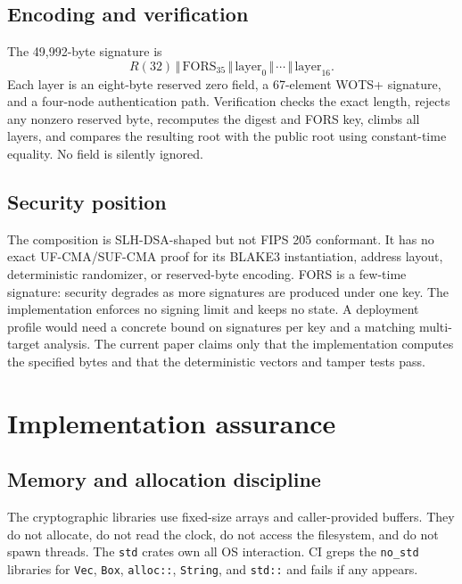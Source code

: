 \documentclass[11pt,a4paper]{article}
\theoremstyle{plain}
\theoremstyle{definition}
\theoremstyle{remark}
\newcommand{\concat}{\,\Vert\,}
\begin{document}
\subsection{Encoding and verification}

The 49,992-byte signature is
\[
 R(32)\concat \mathrm{FORS}_{35}\concat
 \mathrm{layer}_0\concat\cdots\concat\mathrm{layer}_{16}.
\]
Each layer is an eight-byte reserved zero field, a 67-element WOTS+
signature, and a four-node authentication path.  Verification checks the
exact length, rejects any nonzero reserved byte, recomputes the digest
and FORS key, climbs all layers, and compares the resulting root with
the public root using constant-time equality.  No field is silently
ignored.

\subsection{Security position}

The composition is SLH-DSA-shaped but not FIPS 205 conformant.  It has
no exact UF-CMA/SUF-CMA proof for its BLAKE3 instantiation, address
layout, deterministic randomizer, or reserved-byte encoding.  FORS
is a few-time signature: security degrades as more signatures are
produced under one key.  The implementation enforces no signing limit
and keeps no state.  A deployment profile would need a concrete bound on
signatures per key and a matching multi-target analysis.  The current
paper claims only that the implementation computes the specified bytes
and that the deterministic vectors and tamper tests pass.

\section{Implementation assurance}
\label{sec:implementation}

\subsection{Memory and allocation discipline}

The cryptographic libraries use fixed-size arrays and caller-provided
buffers.  They do not allocate, do not read the clock, do not access the
filesystem, and do not spawn threads.  The \texttt{std} crates own all
OS interaction.  CI greps the \texttt{no\_std} libraries for
\texttt{Vec}, \texttt{Box}, \texttt{alloc::}, \texttt{String}, and
\texttt{std::} and fails if any appears.
\end{document}
